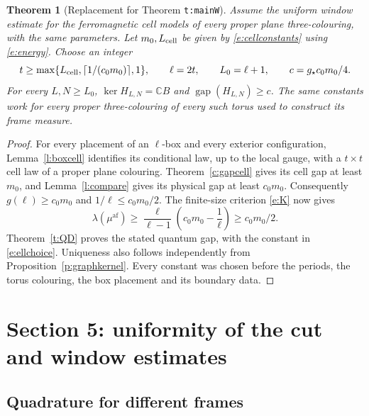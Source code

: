 \documentclass[11pt,reqno]{amsart}
\newtheorem{theorem}{Theorem}[section]
\theoremstyle{definition}
\newcommand{\C}{\mathbb C}
\newcommand{\gap}{\operatorname{gap}}
\newcommand{\af}{\mathrm{af}}
\begin{document}
\begin{theorem}[Replacement for Theorem \texttt{t:mainW}]
\label{t:mainW}
Assume the uniform window estimate for the ferromagnetic cell models
of every proper plane three-colouring, with the same parameters.
Let $m_0,L_{\rm cell}$ be given by \eqref{e:cellconstants} using
\eqref{e:energy}. Choose an integer
\begin{equation}\label{e:ellchoice}
 t\ge\max\{L_{\rm cell},\lceil1/(c_0m_0)\rceil,1\},\qquad
 \ell=2t,\qquad L_0=\ell+1,\qquad c=g_\star c_0m_0/4.
\end{equation}
For every $L,N\ge L_0$, $\ker H_{L,N}=\C B$ and
$\gap(H_{L,N})\ge c$. The same constants work for every proper
three-colouring of every such torus used to construct its frame measure.
\end{theorem}
\begin{proof}
For every placement of an $\ell$-box and every exterior configuration,
Lemma~\ref{l:boxcell} identifies its conditional law, up to the local
gauge, with a $t\times t$ cell law of a proper plane colouring.
Theorem~\ref{c:gapcell} gives its cell gap at least $m_0$, and
Lemma~\ref{l:compare} gives its physical gap at least $c_0m_0$.
Consequently $g(\ell)\ge c_0m_0$ and $1/\ell\le c_0m_0/2$.
The finite-size criterion \eqref{e:K} now gives
\begin{equation}\label{e:classicalgap}
 \lambda(\mu^{\af})\ge\frac{\ell}{\ell-1}
                 \left(c_0m_0-\frac1\ell\right)\ge c_0m_0/2.
\end{equation}
Theorem~\ref{t:QD} proves the stated quantum gap, with the constant in
\eqref{e:ellchoice}. Uniqueness also follows independently from
Proposition~\ref{p:graphkernel}. Every constant was chosen before the
periods, the torus colouring, the box placement and its boundary data.
\end{proof}

\section{Section 5: uniformity of the cut and window estimates}
\label{s:cut}

\subsection{Quadrature for different frames}
\end{document}
